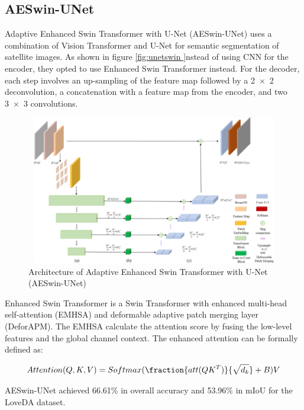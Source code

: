 \subsection{AESwin-UNet}
Adaptive Enhanced Swin Transformer with U-Net (AESwin-UNet) \cite{unet-transformer}  uses a combination of Vision Transformer and U-Net for semantic segmentation of satellite images. As shown in figure \ref{fig:unetswin }nstead of using CNN for the encoder, they opted to use Enhanced Swin Transformer instead.  For the decoder, each step involves an up-sampling of the feature map followed by a 2 × 2 deconvolution, a concatenation with a feature map from the encoder, and two 3 × 3 convolutions. 

\FloatBarrier
\begin{figure}[ht]
\includegraphics[width=12.5cm, height=6.5cm]{images/unet-trasnformer.jpg}
\centering
\caption{Architecture of Adaptive Enhanced Swin Transformer with U-Net (AESwin-UNet)}
\label{fig:unetswin}
\end{figure}

Enhanced Swin Transformer is a Swin Transformer  with enhanced multi-head self-attention (EMHSA) and deformable adaptive patch merging layer (DeforAPM). The EMHSA calculate  the attention score by fusing the low-level features and the global channel context. The enhanced attention can be formally defined as:

\begin{equation}
    Attention(Q,K,V) = Softmax(\fraction{att(QK^T)}{\sqrt{d_k}}+B)V
\end{equation}

AESwin-UNet achieved 66.61\% in overall accuracy and 53.96\% in mIoU for the LoveDA dataset.


